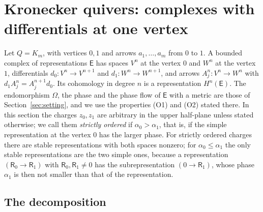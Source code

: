 \section{Kronecker quivers: complexes with differentials at one vertex}\label{sec:kronecker}

Let $Q=K_m$, with vertices $0,1$ and arrows $a_1,\dots,a_m$ from $0$ to $1$.
A bounded complex of representations $\mathsf E$ has spaces $V^n$ at the
vertex $0$ and $W^n$ at the vertex $1$, differentials
$d_0:V^n\to V^{n+1}$ and $d_1:W^n\to W^{n+1}$, and arrows
$A_j^n:V^n\to W^n$ with $d_1A_j^n=A_j^{n+1}d_0$. Its cohomology in degree $n$
is a representation $H^n(\mathsf E)$. The endomorphism $\Omega$, the phase
and the phase flow of $\mathsf E$ with a metric are those of
Section~\ref{sec:setting}, and we use the properties (O1) and (O2) stated
there. In this section the charges $z_0,z_1$ are arbitrary in the upper
half-plane unless stated otherwise; we call them \emph{strictly ordered} if
$\alpha_0>\alpha_1$, that is, if the simple representation at the vertex $0$
has the larger phase. For strictly ordered charges there are stable
representations with both spaces nonzero; for $\alpha_0\leq\alpha_1$ the only
stable representations are the two simple ones, because a representation
$(\mathsf R_0\to\mathsf R_1)$ with $\mathsf R_0,\mathsf R_1\neq0$ has the subrepresentation $(0\to\mathsf R_1)$, whose phase $\alpha_1$ is then
not smaller than that of the representation.

\subsection{The decomposition}

